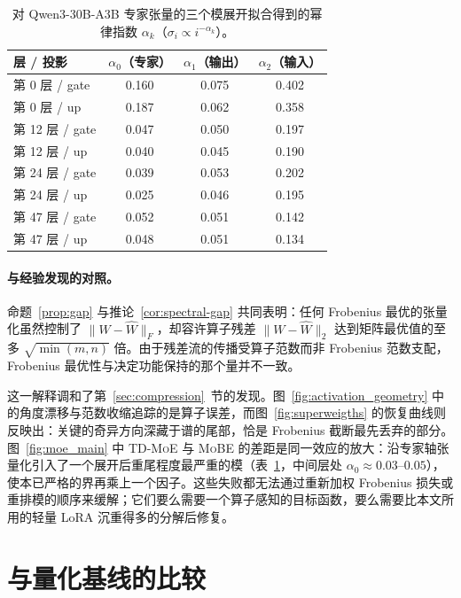 \documentclass[11pt]{article}
\begin{document}
\begin{mainpart}
\begin{table}[t]
\centering
\small
\caption{对 Qwen3-30B-A3B 专家张量的三个模展开拟合得到的幂律指数 $\alpha_k$（$\sigma_i \propto i^{-\alpha_k}$）。}
\label{tab:alpha}
\begin{tabular}{lccc}
\toprule
层 / 投影 & $\alpha_0$（专家） & $\alpha_1$（输出） & $\alpha_2$（输入） \\
\midrule
第 0 层 / gate  & 0.160 & 0.075 & 0.402 \\
第 0 层 / up    & 0.187 & 0.062 & 0.358 \\
第 12 层 / gate & 0.047 & 0.050 & 0.197 \\
第 12 层 / up   & 0.040 & 0.045 & 0.190 \\
第 24 层 / gate & 0.039 & 0.053 & 0.202 \\
第 24 层 / up   & 0.025 & 0.046 & 0.195 \\
第 47 层 / gate & 0.052 & 0.051 & 0.142 \\
第 47 层 / up   & 0.048 & 0.051 & 0.134 \\
\bottomrule
\end{tabular}
\vspace{-2mm}
\end{table}

\paragraph{与经验发现的对照。} 命题~\ref{prop:gap} 与推论~\ref{cor:spectral-gap} 共同表明：任何 Frobenius 最优的张量化虽然控制了 $\|W - \widehat{W}\|_F$，却容许算子残差 $\|W - \widehat{W}\|_2$ 达到矩阵最优值的至多 $\sqrt{\min(m,n)}$ 倍。由于残差流的传播受算子范数而非 Frobenius 范数支配，Frobenius 最优性与决定功能保持的那个量并不一致。

这一解释调和了第~\ref{sec:compression}~节的发现。图~\ref{fig:activation_geometry} 中的角度漂移与范数收缩追踪的是算子误差，而图~\ref{fig:superweigths} 的恢复曲线则反映出：关键的奇异方向深藏于谱的尾部，恰是 Frobenius 截断最先丢弃的部分。图~\ref{fig:moe_main} 中 \textsc{TD-MoE} 与 \textsc{MoBE} 的差距是同一效应的放大：沿专家轴张量化引入了一个展开后重尾程度最严重的模（表~\ref{tab:alpha}，中间层处 $\alpha_0 \approx 0.03\text{--}0.05$），使本已严格的界再乘上一个因子。这些失败都无法通过重新加权 Frobenius 损失或重排模的顺序来缓解；它们要么需要一个算子感知的目标函数，要么需要比本文所用的轻量 LoRA 沉重得多的分解后修复。


\section{与量化基线的比较}
\label{sec:ptq-comparison}


\end{mainpart}
\end{document}
